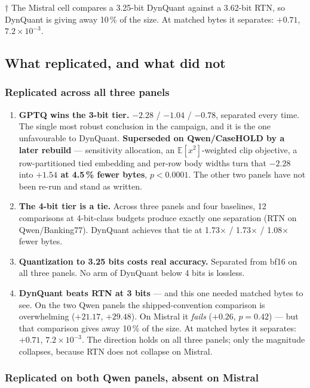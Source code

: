 \documentclass[11pt]{article}
\newcommand{\x}{\texorpdfstring{$\times$}{x}}
\newcommand{\pct}{\,\%}
\newcommand{\e}[2]{$#1\!\times\!10^{#2}$}
\newcommand{\best}[1]{\textbf{#1}}
\begin{document}
$\dagger$ The Mistral cell compares a 3.25-bit DynQuant against a 3.62-bit RTN, so DynQuant is
giving away 10\pct{} of the size. At matched bytes it separates: \best{$+0.71$}, \e{7.2}{-3}.

\subsection{What replicated, and what did not}
\label{sec:replication}

\subsubsection*{Replicated across all three panels}

\begin{enumerate}[leftmargin=1.4em]
\item \textbf{GPTQ wins the 3-bit tier.} $-2.28$ / $-1.04$ / $-0.78$, separated every time. The
single most robust conclusion in the campaign, and it is the one unfavourable to DynQuant.
\textbf{Superseded on Qwen/CaseHOLD by a later rebuild} --- sensitivity allocation, an
$\mathbb{E}[x^2]$-weighted clip objective, a row-partitioned tied embedding and per-row body
widths turn that $-2.28$ into \best{$+1.54$ at 4.5\pct{} fewer bytes}, $p < 0.0001$. The other two
panels have not been re-run and stand as written.

\item \textbf{The 4-bit tier is a tie.} Across three panels and four baselines, 12 comparisons at
4-bit-class budgets produce exactly one separation (RTN on Qwen/Banking77). DynQuant achieves that
tie at 1.73\x{} / 1.73\x{} / 1.08\x{} fewer bytes.

\item \textbf{Quantization to 3.25 bits costs real accuracy.} Separated from bf16 on all three
panels. No arm of DynQuant below 4 bits is lossless.

\item \textbf{DynQuant beats RTN at 3 bits} --- and this one needed matched bytes to see. On the
two Qwen panels the shipped-convention comparison is overwhelming ($+21.17$, $+29.48$). On Mistral
it \emph{fails} ($+0.26$, $p = 0.42$) --- but that comparison gives away 10\pct{} of the size. At
matched bytes it separates: \best{$+0.71$}, \e{7.2}{-3}. The direction holds on all three panels;
only the magnitude collapses, because RTN does not collapse on Mistral.
\end{enumerate}

\subsubsection*{Replicated on both Qwen panels, absent on Mistral}
\end{document}
